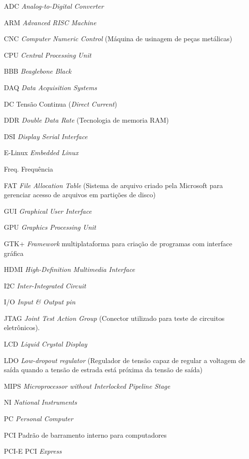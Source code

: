 \begin{siglas}
	\item[ADC] \emph{Analog-to-Digital Converter}
	\item[ARM] \emph{Advanced RISC Machine}
	\item[CNC]  \emph{Computer Numeric Control} (Máquina de usinagem de peças metálicas)
	\item[CPU] \emph{Central Processing Unit}
	\item[BBB] \emph{Beaglebone Black}
	\item[DAQ] \emph{Data Acquisition Systems}
	\item[DC] Tensão Continua (\emph{Direct Current})
	\item[DDR] \emph{Double Data Rate} (Tecnologia de memoria RAM)
	\item[DSI] \emph{Display Serial Interface}
	\item[E-Linux] \emph{Embedded Linux}
	\item[Freq.] Frequência
	\item[FAT] \emph{File Allocation Table} (Sistema de arquivo criado pela Microsoft para gerenciar acesso de arquivos em partições de disco)
	\item[GUI] \emph{Graphical User Interface}
	\item[GPU] \emph{Graphics Processing Unit}
	\item[GTK+] \emph{Framework} multiplataforma para criação de programas com interface gráfica 
	\item[HDMI] \emph{High-Definition Multimedia Interface}
	\item[I2C] \emph{Inter-Integrated Circuit} 
	\item[I/O] \emph{Input \& Output pin}
	\item[JTAG] \emph{Joint Test Action Group} (Conector utilizado para teste de circuitos eletrônicos).
	\item[LCD] \emph{Liquid Crystal Display} 
	\item[LDO] \emph{Low-dropout regulator} (Regulador de tensão capaz de regular a voltagem de saída quando a tensão de estrada está próxima da tensão de saída)
	\item[MIPS] \emph{Microprocessor without Interlocked Pipeline Stage}
	\item[NI] \emph{National Instruments}
	\item[PC] \emph{Personal Computer}
	\item[PCI] Padrão de barramento interno para computadores
	\item[PCI-E] PCI \emph{Express}

\end{siglas}
